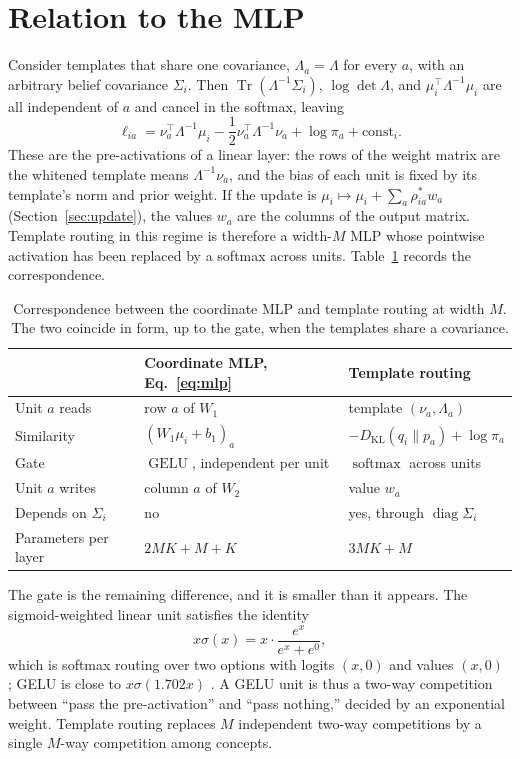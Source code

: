 \documentclass[11pt]{article}
\theoremstyle{definition}
\theoremstyle{remark}
\newcommand{\KL}{D_{\mathrm{KL}}}
\newcommand{\softmax}{\operatorname{softmax}}
\newcommand{\Tr}{\operatorname{Tr}}
\newcommand{\diag}{\operatorname{diag}}
\begin{document}
\section{Relation to the MLP}

Consider templates that share one covariance, $\Lambda_a=\Lambda$ for every $a$, with an arbitrary belief covariance $\Sigma_i$. Then $\Tr(\Lambda^{-1}\Sigma_i)$, $\log\det\Lambda$, and $\mu_i^{\top}\Lambda^{-1}\mu_i$ are all independent of $a$ and cancel in the softmax, leaving
\begin{equation}
\ell_{ia}=\nu_a^{\top}\Lambda^{-1}\mu_i-\frac12\nu_a^{\top}\Lambda^{-1}\nu_a+\log\pi_a+\text{const}_i.
\label{eq:affine_logits}
\end{equation}
These are the pre-activations of a linear layer: the rows of the weight matrix are the whitened template means $\Lambda^{-1}\nu_a$, and the bias of each unit is fixed by its template's norm and prior weight. If the update is $\mu_i\mapsto\mu_i+\sum_a\rho^{*}_{ia}w_a$ (Section~\ref{sec:update}), the values $w_a$ are the columns of the output matrix. Template routing in this regime is therefore a width-$M$ MLP whose pointwise activation has been replaced by a softmax across units. Table~\ref{tab:correspondence} records the correspondence.

\begin{table}[h]
\centering
\begin{tabular}{@{}lll@{}}
\toprule
 & Coordinate MLP, Eq.~\eqref{eq:mlp} & Template routing \\
\midrule
Unit $a$ reads & row $a$ of $W_1$ & template $(\nu_a,\Lambda_a)$ \\
Similarity & $(W_1\mu_i+b_1)_a$ & $-\KL(q_i\|p_a)+\log\pi_a$ \\
Gate & $\operatorname{GELU}$, independent per unit & $\softmax$ across units \\
Unit $a$ writes & column $a$ of $W_2$ & value $w_a$ \\
Depends on $\Sigma_i$ & no & yes, through $\diag\Sigma_i$ \\
Parameters per layer & $2MK+M+K$ & $3MK+M$ \\
\bottomrule
\end{tabular}
\caption{Correspondence between the coordinate MLP and template routing at width $M$. The two coincide in form, up to the gate, when the templates share a covariance.}
\label{tab:correspondence}
\end{table}

The gate is the remaining difference, and it is smaller than it appears. The sigmoid-weighted linear unit satisfies the identity
\begin{equation}
x\sigma(x)=x\cdot\frac{e^{x}}{e^{x}+e^{0}},
\label{eq:silu}
\end{equation}
which is softmax routing over two options with logits $(x,0)$ and values $(x,0)$ \citep{elfwing2018,ramachandran2017}; GELU is close to $x\sigma(1.702x)$ \citep{hendrycks2016}. A GELU unit is thus a two-way competition between ``pass the pre-activation'' and ``pass nothing,'' decided by an exponential weight. Template routing replaces $M$ independent two-way competitions by a single $M$-way competition among concepts.
\end{document}
